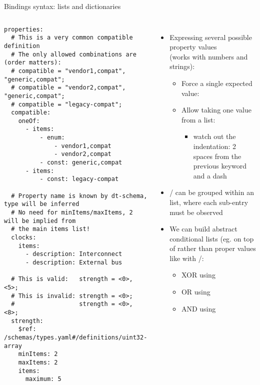 \begin{frame}[fragile]{Bindings syntax: lists and dictionaries}
  \begin{columns}
    \begin{block}{}
      {\fontsize{5}{6}\selectfont
\begin{verbatim}
properties:
  # This is a very common compatible definition
  # The only allowed combinations are (order matters):
  # compatible = "vendor1,compat", "generic,compat";
  # compatible = "vendor2,compat", "generic,compat";
  # compatible = "legacy-compat";
  compatible:
    oneOf:
      - items:
          - enum:
              - vendor1,compat
              - vendor2,compat
          - const: generic,compat
      - items:
          - const: legacy-compat

  # Property name is known by dt-schema, type will be inferred
  # No need for minItems/maxItems, 2 will be implied from
  # the main items list!
  clocks:
    items:
      - description: Interconnect
      - description: External bus

  # This is valid:   strength = <0>, <5>;
  # This is invalid: strength = <0>;
  #                  strength = <0>, <8>;
  strength:
    $ref: /schemas/types.yaml#/definitions/uint32-array
    minItems: 2
    maxItems: 2
    items:
      maximum: 5
\end{verbatim}
      }
    \end{block}
    \begin{itemize}
    \item Expressing several possible property values\\
      (works with numbers and strings):
      \begin{itemize}
      \item Force a single expected value: 
      \item Allow taking one value from a list: 
        \begin{itemize}
        \item watch out the indentation: 2 spaces from the previous
          keyword and a dash
        \end{itemize}
      \end{itemize}
    \item {}/ can be grouped within an 
      list, where each  sub-entry must be observed
    \item We can build abstract conditional lists (eg. on top of
       rather than proper values like with
      /:
      \begin{itemize}
      \item XOR using 
      \item OR using 
      \item AND using 
      \end{itemize}
    \end{itemize}
  \end{columns}
\end{frame}

